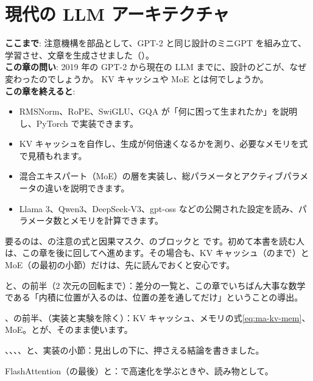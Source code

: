 \chapter{現代の LLM アーキテクチャ}\label{ch:modern-arch}

\begin{chapterlead}
\textbf{ここまで}: 注意機構を部品として、GPT-2 と同じ設計のミニGPT を組み立て、学習させ、文章を生成させました（）。\\[1mm]
\textbf{この章の問い}: 2019 年の GPT-2 から現在の LLM までに、設計のどこが、なぜ変わったのでしょうか。
KV キャッシュや MoE とは何でしょうか。\\[1mm]
\textbf{この章を終えると}:
\begin{itemize}
\item RMSNorm、RoPE、SwiGLU、GQA が「何に困って生まれたか」を説明し、PyTorch で実装できます。
\item KV キャッシュを自作し、生成が何倍速くなるかを測り、必要なメモリを式で見積もれます。
\item 混合エキスパート（MoE）の層を実装し、総パラメータとアクティブパラメータの違いを説明できます。
\item Llama 3、Qwen3、DeepSeek-V3、gpt-oss などの公開された設定を読み、パラメータ数とメモリを計算できます。
\end{itemize}
\end{chapterlead}

\begin{readingguide}
\item[\rgpre] 要るのは、の注意の式と因果マスク、のブロックと  です。初めて本書を読む人は、この章を後に回してへ進めます。その場合も、KV キャッシュ（のまで）と MoE（の最初の小節）だけは、先に読んでおくと安心です。
\item[\rgmust] と、の前半（2 次元の回転まで）：差分の一覧と、この章でいちばん大事な数学である「内積に位置が入るのは、位置の差を通してだけ」ということの導出。
\item[\rgmust] 、の前半、（実装と実験を除く）：KV キャッシュ、メモリの式\eqref{eq:ma-kv-mem}、MoE。とが、そのまま使います。
\item[\rgskim] 、、、、と、実装の小節：見出しの下に、押さえる結論を書きました。
\item[\rglater] FlashAttention（の最後）と：で高速化を学ぶときや、読み物として。
\end{readingguide}

